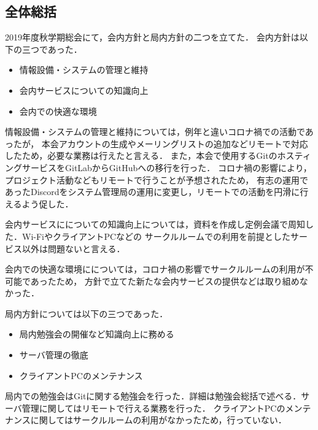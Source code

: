 \subsection*{全体総括}


2019年度秋学期総会にて，会内方針と局内方針の二つを立てた．
会内方針は以下の三つであった．
\begin{itemize}
    \item 情報設備・システムの管理と維持
    \item 会内サービスについての知識向上
    \item 会内での快適な環境
\end{itemize}

情報設備・システムの管理と維持については，例年と違いコロナ禍での活動であったが，
本会アカウントの生成やメーリングリストの追加などリモートで対応したため，必要な業務は行えたと言える．
また，本会で使用するGitのホスティングサービスをGitLabからGitHubへの移行を行った．
コロナ禍の影響により，プロジェクト活動などもリモートで行うことが予想されたため，
有志の運用であったDiscordをシステム管理局の運用に変更し，リモートでの活動を円滑に行えるよう促した．


会内サービスにについての知識向上については，資料を作成し定例会議で周知した．Wi-FiやクライアントPCなどの
サークルルームでの利用を前提としたサービス以外は問題ないと言える．

会内での快適な環境にについては，コロナ禍の影響でサークルルームの利用が不可能であったため，
方針で立てた新たな会内サービスの提供などは取り組めなかった．

局内方針については以下の三つであった．
\begin{itemize}
    \item 局内勉強会の開催など知識向上に務める
    \item サーバ管理の徹底
    \item クライアントPCのメンテナンス
\end{itemize}
  
局内での勉強会はGitに関する勉強会を行った．詳細は勉強会総括で述べる．サーバ管理に関してはリモートで行える業務を行った．
クライアントPCのメンテナンスに関してはサークルルームの利用がなかったため，行っていない．
